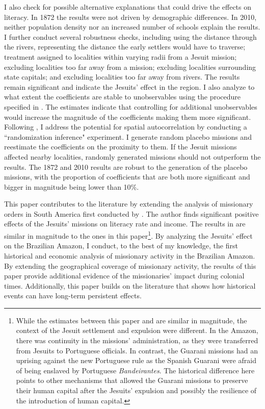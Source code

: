 \documentclass{article}
\begin{document}
I also check for possible alternative explanations that could drive the effects on literacy. 
In 1872 the results were not driven by demographic differences. 
In 2010, neither population density nor an increased number of schools explain the results.
I further conduct several robustness checks, including using the distance through the rivers, representing the distance the early settlers would have to traverse; treatment assigned to localities within varying radii from a Jesuit mission; excluding localities too far away from a mission; excluding localities surrounding state capitals; and excluding localities too far away from rivers. 
The results remain significant and indicate the Jesuits' effect in the region. 
I also analyze to what extent the coefficients are stable to unobservables using the procedure specified in \textcite{Oster2019-qd}. 
The estimates indicate that controlling for additional unobservables would increase the magnitude of the coefficients making them more significant.
Following \textcite{Kelly2019-ln}, I address the potential for spatial autocorrelation by conducting a ``randomization inference" experiment. 
I generate random placebo missions and reestimate the coefficients on the proximity to them. 
If the Jesuit missions affected nearby localities,  randomly generated missions should not outperform the results. 
The 1872 and 2010 results are robust to the generation of the placebo missions, with the proportion of coefficients that are both more significant and bigger in magnitude being lower than 10\%. 

This paper contributes to the literature by extending the analysis of missionary orders in South America first conducted by \cite{Valencia_Caicedo2018-gp}. 
The author finds significant positive effects of the Jesuits' missions on literacy rate and income. 
The results in \textcite{Valencia_Caicedo2018-gp} are similar in magnitude to the ones in this paper\footnote{
  While the estimates between this paper and \textcite{Valencia_Caicedo2018-gp} are similar in magnitude, the context of the Jesuit settlement and expulsion were different. 
  In the Amazon, there was continuity in the missions' administration, as they were transferred from Jesuits to Portuguese officials. 
  In contrast, the Guarani missions had an uprising against the new Portuguese rule as the Spanish Guarani were afraid of being enslaved by Portuguese \textit{Bandeirantes}. 
  The historical difference here points to other mechanisms that allowed the Guarani missions to preserve their human capital after the Jesuits' expulsion and possibly the resilience of the introduction of human capital.}. 
By analyzing the Jesuits' effect on the Brazilian Amazon, I conduct, to the best of my knowledge, the first historical and economic analysis of missionary activity in the Brazilian Amazon.  
By extending the geographical coverage of missionary activity, the results of this paper provide additional evidence of the missionaries' impact during colonial times. Additionally, this paper builds on the literature that shows how historical events can have long-term persistent effects.
\end{document}
